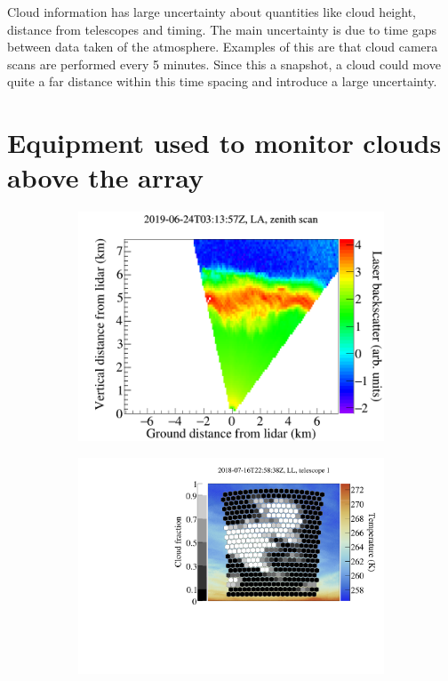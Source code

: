Cloud information has large uncertainty about quantities like cloud height, distance from telescopes and timing. The main uncertainty is due to time gaps between data taken of the atmosphere. Examples of this are that cloud camera scans are performed every 5 minutes. Since this a snapshot, a cloud could move quite a far distance within this time spacing and introduce a large uncertainty.

\section{Equipment used to monitor clouds above the array} \label{sec:MonitoringEquipment}



\begin{figure}[!t]
\begin{subfigure}[b]{0.3\textwidth}
\includegraphics[width=\textwidth]{chapters/graphs/CloudFlags/lidar_scan.png}
\caption{} \label{subfig:liadr_scan}
\end{subfigure}
\begin{subfigure}[b]{0.3\textwidth}
\includegraphics[width=\textwidth]{chapters/graphs/CloudFlags/ir_cloudfraction_pixels.pdf}

\end{subfigure}
\end{figure}
